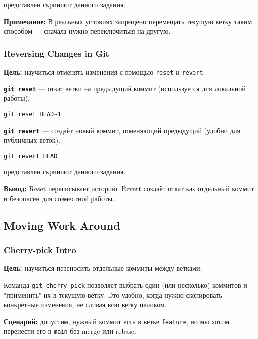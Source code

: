 \documentclass[a4paper,12pt]{report}
\begin{document}
 представлен скриншот данного задания.

\textbf{Примечание:} В реальных условиях запрещено перемещать текущую ветку таким способом — сначала нужно переключиться на другую.

\subsubsection{Reversing Changes in Git}
\textbf{Цель:} научиться отменять изменения с помощью \texttt{reset} и \texttt{revert}.

\textbf{\texttt{git reset}} — откат ветки на предыдущий коммит (используется для локальной работы).

\begin{verbatim}
git reset HEAD~1
\end{verbatim}

\textbf{\texttt{git revert}} — создаёт новый коммит, отменяющий предыдущий (удобно для публичных веток).

\begin{verbatim}
git revert HEAD
\end{verbatim}

 представлен скриншот данного задания.

\textbf{Вывод:} Reset переписывает историю. Revert создаёт откат как отдельный коммит и безопасен для совместной работы.

\subsection{Moving Work Around}

\subsubsection{Cherry-pick Intro}
\textbf{Цель:} научиться переносить отдельные коммиты между ветками.

Команда \texttt{git cherry-pick} позволяет выбрать один (или несколько) коммитов и "применить" их в текущую ветку. Это удобно, когда нужно скопировать конкретные изменения, не сливая всю ветку целиком.

\textbf{Сценарий:} допустим, нужный коммит есть в ветке \texttt{feature}, но мы хотим перенести его в \texttt{main} без merge или rebase.
\end{document}
